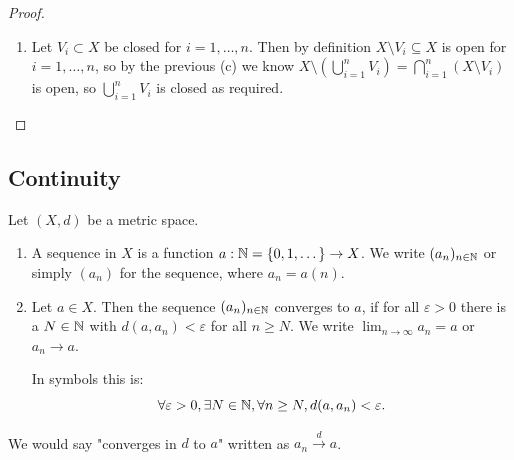 \documentclass[10pt, a4paper]{article}
\begin{document}
\begin{lemma}
\begin{proof}
\begin{enumerate}[label = (\alph*)]
            \item
            Let $V_i \subset X$ be closed for $i = 1, \dotsc, n$.
            Then by definition $X \setminus V_i \subseteq X$ is open for $i = 1, \dotsc, n$,
            so by the previous
            (c)
            we know $X \setminus \left(\bigcup_{i = 1}^{n}V_i\right) = \bigcap_{i = 1}^{n}(X \setminus V_i)$ is open,
            so $\bigcup_{i = 1}^{n}V_i$ is closed as required.
        \end{enumerate}
    \end{proof}
\end{lemma}

\subsection{Continuity}

\begin{definition}
    Let $(X, d)$ be a metric space.

    \begin{enumerate}[label = (\alph*)]
        \item A sequence in $X$ is a function $a : \mathbb{N} = \{0, 1, \dotsc\} \to X$.
        We write $(a_n)_{n \in \mathbb{N}}$ or simply $(a_n)$ for the sequence,
        where $a_n = a(n)$.

        \item Let $a \in X$.
        Then the sequence $(a_n)_{n \in \mathbb{N}}$ converges to $a$,
        if for all $\varepsilon > 0$ there is a $N \in \mathbb{N}$ with $d(a, a_n) < \varepsilon$ for all $n \geq N$.
        We write $\lim_{n \to \infty}a_n = a$ or $a_n \to a$.
        
        In symbols this is:
        \[
        \forall \varepsilon > 0, \exists N \in \mathbb{N}, \forall n \geq N, d(a, a_n) < \varepsilon.
        \]
    \end{enumerate}
\end{definition}

We would say "converges in $d$ to $a$" written as $a_n \xrightarrow{d} a$.
\end{document}
